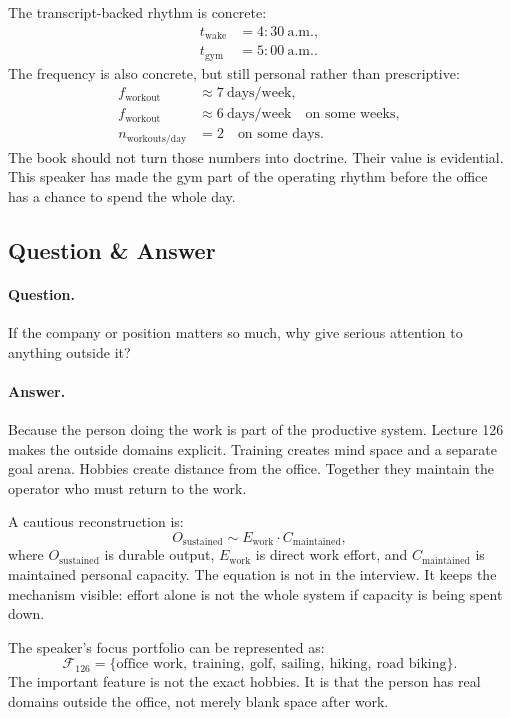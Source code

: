 \documentclass[11pt,oneside]{book}
\begin{document}
The transcript-backed rhythm is concrete:
\begin{align}
t_{\mathrm{wake}} &= 4{:}30\ \mathrm{a.m.},\\
t_{\mathrm{gym}}  &= 5{:}00\ \mathrm{a.m.}.
\end{align}
The frequency is also concrete, but still personal rather than prescriptive:
\begin{align}
f_{\mathrm{workout}} &\approx 7\ \text{days/week},\\
f_{\mathrm{workout}} &\approx 6\ \text{days/week}\quad \text{on some weeks},\\
n_{\mathrm{workouts/day}} &= 2\quad \text{on some days}.
\end{align}
The book should not turn those numbers into doctrine. Their value is evidential. This speaker has made the gym part of the operating rhythm before the office has a chance to spend the whole day.

\subsection{Question \& Answer}

\paragraph{Question.}
If the company or position matters so much, why give serious attention to anything outside it?

\paragraph{Answer.}
Because the person doing the work is part of the productive system. Lecture 126 makes the outside domains explicit. Training creates mind space and a separate goal arena. Hobbies create distance from the office. Together they maintain the operator who must return to the work.

A cautious reconstruction is:
\[
O_{\mathrm{sustained}}
\sim
E_{\mathrm{work}}\cdot C_{\mathrm{maintained}},
\]
where \(O_{\mathrm{sustained}}\) is durable output, \(E_{\mathrm{work}}\) is direct work effort, and \(C_{\mathrm{maintained}}\) is maintained personal capacity. The equation is not in the interview. It keeps the mechanism visible: effort alone is not the whole system if capacity is being spent down.

The speaker's focus portfolio can be represented as:
\[
\mathcal{F}_{126}
=
\{\text{office work},\ \text{training},\ \text{golf},\ \text{sailing},\ \text{hiking},\ \text{road biking}\}.
\]
The important feature is not the exact hobbies. It is that the person has real domains outside the office, not merely blank space after work.
\end{document}
